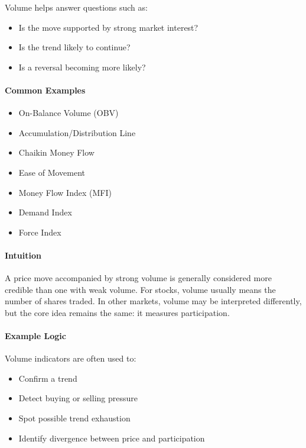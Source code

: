 \documentclass[12pt,openany]{book}
\begin{document}
Volume helps answer questions such as:

\begin{itemize}[leftmargin=*]
    \item Is the move supported by strong market interest?
    \item Is the trend likely to continue?
    \item Is a reversal becoming more likely?
\end{itemize}

\paragraph{Common Examples}
\begin{itemize}[leftmargin=*]
    \item On-Balance Volume (OBV)
    \item Accumulation/Distribution Line
    \item Chaikin Money Flow
    \item Ease of Movement
    \item Money Flow Index (MFI)
    \item Demand Index
    \item Force Index
\end{itemize}

\paragraph{Intuition}
A price move accompanied by strong volume is generally considered more credible than one with weak volume. For stocks, volume usually means the number of shares traded. In other markets, volume may be interpreted differently, but the core idea remains the same: it measures participation.

\paragraph{Example Logic}
Volume indicators are often used to:

\begin{itemize}[leftmargin=*]
    \item Confirm a trend
    \item Detect buying or selling pressure
    \item Spot possible trend exhaustion
    \item Identify divergence between price and participation
\end{itemize}
\end{document}
